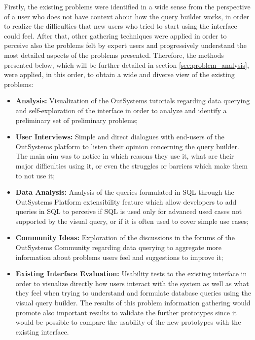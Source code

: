 Firstly, the existing problems were identified in a wide sense from the perspective of a user who does not have context about how the query builder works, in order to realize the difficulties that new users who tried to start using the interface could feel. After that, other gathering techniques were applied in order to perceive also the problems felt by expert users and progressively understand the most detailed aspects of the problems presented. Therefore, the methods presented below, which will be further detailed in section \ref{sec:problem_analysis}, were applied, in this order, to obtain a wide and diverse view of the existing problems: 

\begin{itemize}
    \item \textbf{Analysis: } Visualization of the OutSystems tutorials regarding data querying and self-exploration of the interface in order to analyze and identify a preliminary set of preliminary problems;
    \item \textbf{User Interviews: } Simple and direct dialogues with end-users of the OutSystems platform to listen their opinion concerning the query builder. The main aim was to notice in which reasons they use it, what are their major difficulties using it, or even the struggles or barriers which make them to not use it; 
    \item \textbf{Data Analysis: } Analysis of the queries formulated in \gls{SQL} through the OutSystems Platform extensibility feature which allow developers to add queries in \gls{SQL} to perceive if \gls{SQL} is used only for advanced used cases not supported by the visual query, or if it is often used to cover simple use cases;
    \item \textbf{Community Ideas: } Exploration of the discussions in the forums of the OutSystems Community regarding data querying to aggregate more information about problems users feel and suggestions to improve it;
    \item \textbf{Existing Interface Evaluation: } Usability tests to the existing interface in order to visualize directly how users interact with the system as well as what they feel when trying to understand and formulate database queries using the visual query builder. The results of this problem information gathering would promote also important results to validate the further prototypes since it would be possible to compare the usability of the new prototypes with the existing interface.
\end{itemize}

